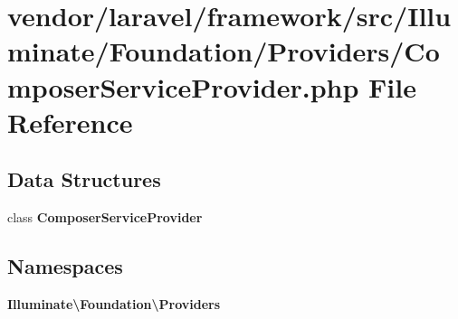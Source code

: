 \section{vendor/laravel/framework/src/\+Illuminate/\+Foundation/\+Providers/\+Composer\+Service\+Provider.php File Reference}
\label{_composer_service_provider_8php}
\subsection*{Data Structures}
\begin{DoxyCompactItemize}
\item 
class {\bf Composer\+Service\+Provider}
\end{DoxyCompactItemize}
\subsection*{Namespaces}
\begin{DoxyCompactItemize}
\item 
 {\bf Illuminate\textbackslash{}\+Foundation\textbackslash{}\+Providers}
\end{DoxyCompactItemize}
